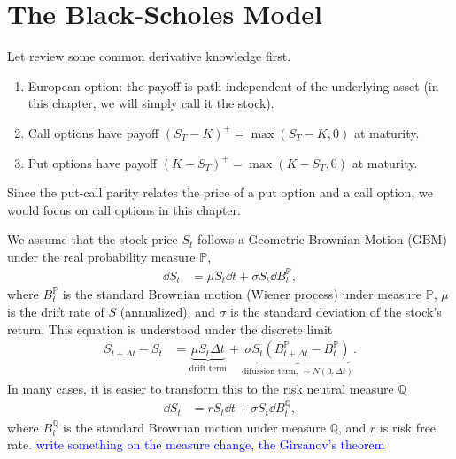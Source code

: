 \documentclass{book}
\begin{document}
\fi

\chapter{The Black-Scholes Model}
Let review some common derivative knowledge first. 
\begin{enumerate}
    \item European option: the payoff is path independent of the underlying asset (in this chapter, we will simply call it the stock).
    \item Call options have payoff $(S_T-K)^+ = \max(S_T-K,0)$ at maturity.
    \item Put options have payoff $(K-S_T)^+ = \max(K-S_T,0)$ at maturity.
\end{enumerate}
Since the put-call parity relates the price of a put option and a call option, we would focus on call options in this chapter.

We assume that the stock price $S_t$ follows a Geometric Brownian Motion (GBM) under the real probability measure $\mathbb{P}$, 
\begin{align}
    \dd S_t &= \mu S_t \dd t +\sigma S_t \dd B_t^\mathbb{P},
    \label{eqn:BSM:stock-GBM-P}
\end{align}
where $B_t^\mathbb{P}$ is the standard Brownian motion (Wiener process) under measure $\mathbb{P}$, $\mu$ is the drift rate of $S$ (annualized), and $\sigma$ is the standard deviation of the stock's return. This equation is understood under the discrete limit
\begin{align}
    S_{t+\Delta t} -S_t &= \underbrace{\mu S_t \Delta t}_{\text{drift term}} + \underbrace{\sigma S_t (B_{t+\Delta t}^\mathbb{P} - B_{t}^\mathbb{P})}_{\text{difussion term, } \sim N(0,\Delta t)}.
    \label{eqn:BSM:stock-GBM-Q-discrete}
\end{align}
In many cases, it is easier to transform this to the risk neutral measure $\mathbb{Q}$
\begin{align}
    \dd S_t &= r S_t \dd t +\sigma S_t \dd B_t^\mathbb{Q},
    \label{eqn:BSM:stock-GBM-Q}
\end{align}
where $B_t^\mathbb{Q}$ is the standard Brownian motion under measure $\mathbb{Q}$, and $r$ is risk free rate. \textcolor{blue}{write something on the measure change, the Girsanov’s theorem}
\end{document}
